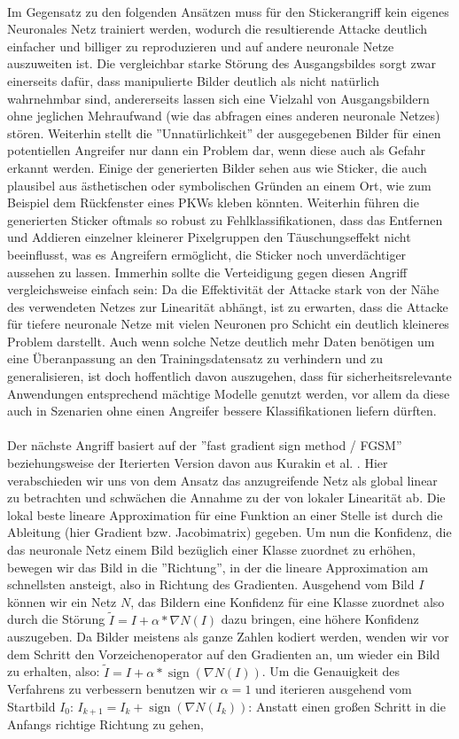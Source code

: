 \documentclass[11pt]{article} %
\newcommand{\sign}{\operatorname{sign}}
\begin{document}
\\Im Gegensatz zu den folgenden Ansätzen muss für den Stickerangriff kein eigenes Neuronales Netz trainiert werden, wodurch die resultierende Attacke deutlich einfacher und billiger zu reproduzieren und auf andere neuronale Netze auszuweiten ist. Die vergleichbar starke Störung des Ausgangsbildes sorgt zwar einerseits dafür, dass manipulierte Bilder deutlich als nicht natürlich wahrnehmbar sind, andererseits lassen sich eine Vielzahl von Ausgangsbildern ohne jeglichen Mehraufwand (wie das abfragen eines anderen neuronale Netzes) stören. Weiterhin stellt die  ''Unnatürlichkeit'' der ausgegebenen Bilder für einen potentiellen Angreifer nur dann ein Problem dar, wenn diese auch als Gefahr erkannt werden. Einige der generierten Bilder sehen aus wie Sticker, die auch plausibel aus  ästhetischen oder symbolischen Gründen an einem Ort, wie zum Beispiel dem Rückfenster eines PKWs  kleben könnten. Weiterhin führen die generierten Sticker oftmals so robust zu Fehlklassifikationen, dass das Entfernen und Addieren einzelner kleinerer Pixelgruppen den Täuschungseffekt nicht beeinflusst, was es Angreifern ermöglicht, die Sticker noch unverdächtiger aussehen zu lassen. Immerhin sollte die Verteidigung gegen diesen Angriff vergleichsweise einfach sein: Da die Effektivität der Attacke stark von der Nähe des verwendeten Netzes zur Linearität abhängt, ist zu erwarten, dass die Attacke für tiefere neuronale Netze mit vielen Neuronen pro Schicht ein deutlich kleineres Problem darstellt. Auch wenn solche Netze deutlich mehr Daten benötigen um eine Überanpassung an den Trainingsdatensatz zu verhindern und zu generalisieren, ist doch hoffentlich davon auszugehen, dass für sicherheitsrelevante Anwendungen entsprechend mächtige Modelle genutzt werden, vor allem da diese auch in Szenarien ohne einen Angreifer bessere Klassifikationen liefern dürften. \\ \\ Der nächste Angriff basiert auf der ''fast gradient sign method / FGSM''\cite{Goodfellow} beziehungsweise der Iterierten Version davon aus Kurakin et al. \cite{Kurakin}. Hier verabschieden wir uns von dem Ansatz das anzugreifende Netz als global linear zu betrachten und schwächen die Annahme zu der von lokaler Linearität ab. Die lokal beste lineare Approximation für eine Funktion an einer Stelle ist durch die Ableitung (hier Gradient bzw. Jacobimatrix) gegeben. Um nun die Konfidenz, die das neuronale Netz einem Bild bezüglich einer Klasse zuordnet zu erhöhen, bewegen wir das Bild in die ''Richtung'', in der die lineare Approximation am schnellsten ansteigt, also in Richtung des Gradienten. Ausgehend vom Bild $I$ können wir ein Netz $N$, das Bildern eine Konfidenz für eine Klasse zuordnet also durch die Störung $\widetilde{I}=I+\alpha*\nabla N(I)$ dazu bringen, eine höhere Konfidenz auszugeben. Da Bilder meistens als ganze Zahlen kodiert werden, wenden wir vor dem Schritt den Vorzeichenoperator auf den Gradienten an, um wieder ein Bild zu erhalten, also: $\widetilde{I}=I+\alpha*\sign(\nabla N(I))$. Um die Genauigkeit des Verfahrens zu verbessern benutzen wir $\alpha=1$ und iterieren ausgehend vom Startbild $I_{0}$: $I_{k+1}=I_{k}+\sign(\nabla N(I_{k}))$: Anstatt einen großen Schritt in die Anfangs richtige Richtung zu gehen, 
\end{document}
